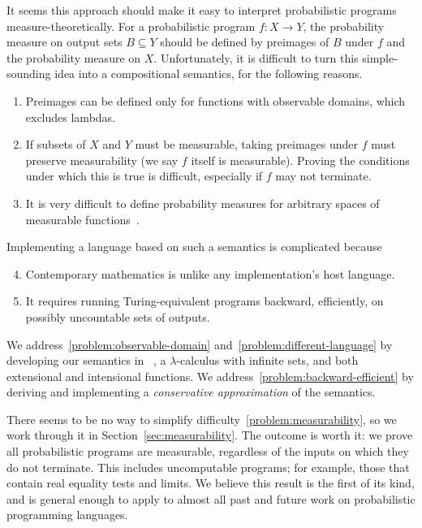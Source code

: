 \documentclass{llncs}
\begin{document}
It seems this approach should make it easy to interpret probabilistic programs measure-theoretically.
For a probabilistic program $f : X \to Y$, the probability measure on output sets $B \subseteq Y$ should be defined by preimages of $B$ under $f$ and the probability measure on $X$.
Unfortunately, it is difficult to turn this simple-sounding idea into a compositional semantics, for the following reasons.
\begin{enumerate}
	\item Preimages can be defined only for functions with observable domains, which excludes lambdas.%
\label{problem:observable-domain}
	\item If subsets of $X$ and $Y$ must be measurable, taking preimages under $f$ must preserve measurability (we say $f$ itself is measurable). Proving the conditions under which this is true is difficult, especially if $f$ may not terminate.%
\label{problem:measurability}
	\item It is very difficult to define probability measures for arbitrary spaces of measurable functions~\cite{cit:aumann-1961ijm-borel}.%
\label{problem:higher-orderness}
\end{enumerate}
Implementing a language based on such a semantics is complicated because
\begin{enumerate}
	\setcounter{enumi}{3}
	\item Contemporary mathematics is unlike any implementation's host language.%
\label{problem:different-language}
	\item It requires running Turing-equivalent programs backward, efficiently, on possibly uncountable sets of outputs.%
\label{problem:backward-efficient}
\end{enumerate}

We address~\ref{problem:observable-domain} and~\ref{problem:different-language} by developing our semantics in \lzfclang~\cite{cit:toronto-2012flops-lzfc}, a $\lambda$-calculus with infinite sets, and both extensional and intensional functions.
We address~\ref{problem:backward-efficient} by deriving and implementing a \emph{conservative approximation} of the semantics.

There seems to be no way to simplify difficulty~\ref{problem:measurability}, so we work through it in Section~\ref{sec:measurability}.
The outcome is worth it: we prove all probabilistic programs are measurable, regardless of the inputs on which they do not terminate.
This includes uncomputable programs; for example, those that contain real equality tests and limits.
We believe this result is the first of its kind, and is general enough to apply to almost all past and future work on probabilistic programming languages.
\end{document}
